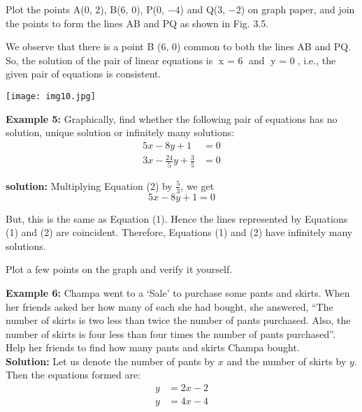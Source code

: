 \documentclass{article}
\begin{document}
\vspace{-1em}
\noindent
\begin{minipage}{0.5\textwidth}
\hspace{2em}
{\fontsize{14}{16}\selectfont
Plot the points A(0, 2), B(6, 0), P(0, $-4$) and Q(3, $-2$) on graph paper, and join the points to form the lines AB and PQ as shown in Fig. 3.5.

\vspace{1em}
\hspace{2em}
We observe that there is a point B (6, 0) common to both the lines AB and PQ. So, the solution of the pair of linear equations is x = 6 and y = 0, i.e., the given pair of equations is consistent.}
\end{minipage}
\begin{minipage}{0.5\textwidth}
    \texttt{[image: img10.jpg]}
\end{minipage}
\newpage
\pagestyle{fancy}
\fancyhf{} %
\textbf{\textcolor{ncertcyan}{Example 5:}} Graphically, find whether the following pair of equations has no solution, unique solution or infinitely many solutions:
\begin{align*}
5x - 8y + 1 &= 0 \tag{1} \\
3x - \frac{24}{5}y + \frac{3}{5} &= 0 \tag{2}
\end{align*}

\textbf{\textcolor{ncertcyan}{solution:}} Multiplying Equation (2) by $\frac{5}{3}$, we get
\[
5x - 8y + 1 = 0
\]

But, this is the same as Equation (1). Hence the lines represented by Equations (1) and (2) are coincident. Therefore, Equations (1) and (2) have infinitely many solutions.

Plot a few points on the graph and verify it yourself.

\vspace{0.5cm}
\textbf{\textcolor{ncertcyan}{Example 6:}} Champa went to a ‘Sale’ to purchase some pants and skirts. When her friends asked her how many of each she had bought, she answered, “The number of skirts is two less than twice the number of pants purchased. Also, the number of skirts is four less than four times the number of pants purchased”. Help her friends to find how many pants and skirts Champa bought.\\
\textbf{\textcolor{ncertcyan}{Solution:}} Let us denote the number of pants by $x$ and the number of skirts by $y$. Then the equations formed are:
\begin{align*}
y &= 2x - 2 \tag{1} \\
y &= 4x - 4 \tag{2}
\end{align*}
\end{document}
